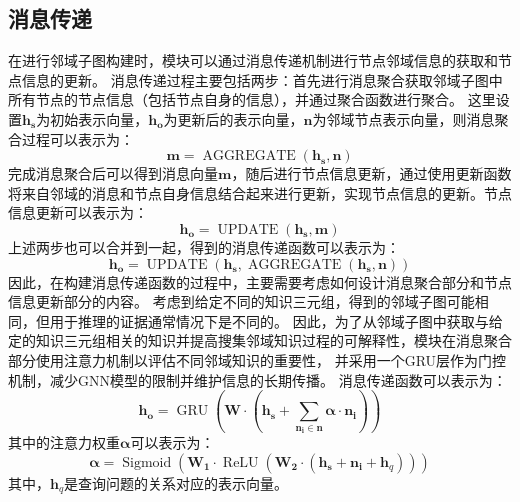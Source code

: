 \documentclass[algorithmlist, AutoFakeBold, AutoFakeSlant, figurelist, tablelist, nomlist, engineering]{seuthesix}
\begin{document}
\subsection{消息传递}
在进行邻域子图构建时，模块可以通过消息传递机制进行节点邻域信息的获取和节点信息的更新。
消息传递过程主要包括两步：首先进行消息聚合获取邻域子图中所有节点的节点信息（包括节点自身的信息），并通过聚合函数进行聚合。
这里设置$\bm{h_s}$为初始表示向量，$\bm{h_o}$为更新后的表示向量，$\bm{n}$为邻域节点表示向量，则消息聚合过程可以表示为：
\begin{equation}
  \bm{m} = \operatorname{AGGREGATE}(\bm{h_s}, \bm{n})
\end{equation}
完成消息聚合后可以得到消息向量$\bm{m}$，随后进行节点信息更新，通过使用更新函数将来自邻域的消息和节点自身信息结合起来进行更新，实现节点信息的更新。节点信息更新可以表示为：
\begin{equation}
  \bm{h_o} = \operatorname{UPDATE}(\bm{h_s}, \bm{m})
\end{equation}
上述两步也可以合并到一起，得到的消息传递函数可以表示为：
\begin{equation}
  \bm{h_o} = \operatorname{UPDATE}(\bm{h_s}, \operatorname{AGGREGATE}(\bm{h_s}, \bm{n}))
  \label{equation_MessagePassing}
\end{equation}
因此，在构建消息传递函数的过程中，主要需要考虑如何设计消息聚合部分和节点信息更新部分的内容。
考虑到给定不同的知识三元组，得到的邻域子图可能相同，但用于推理的证据通常情况下是不同的。
因此，为了从邻域子图中获取与给定的知识三元组相关的知识并提高搜集邻域知识过程的可解释性，模块在消息聚合部分使用注意力机制以评估不同邻域知识的重要性，
并采用一个GRU层作为门控机制，减少GNN模型的限制并维护信息的长期传播。
消息传递函数可以表示为：
\begin{equation}
  \bm{h_o} = \operatorname{GRU}(\mathbf{W} \cdot (\bm{h_s} + \sum_{\bm{n_i} \in \bm{n}}{\bm{\alpha} \cdot \bm{n_i}}))
  \label{equation_newMessagePassing}
\end{equation}
其中的注意力权重$\bm{\alpha}$可以表示为：
\begin{equation}
  \bm{\alpha} = \operatorname{Sigmoid}(\mathbf{W_{1}} \cdot \operatorname{ReLU}(\mathbf{W_{2}} \cdot (\bm{h_s} + \bm{n_i} + \bm{h}_q)))
  \label{equation_Alpha}
\end{equation}
其中，$\bm{h}_q$是查询问题的关系对应的表示向量。

\end{document}
